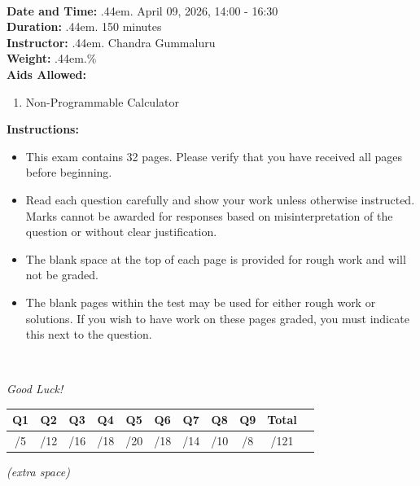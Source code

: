 \documentclass[12pt]{article}
\makeatletter
\newcommand\cdotfill{%
    \leavevmode\cleaders\hb@xt@.44em{\hss$.$\hss}\hfill\kern\z@
}
\makeatother
\begin{document}
\begin{minipage}{0.6\textwidth}
\begin{tabular}{|c|c|c|c|c|c|c|c|c|c|}
  \hspace{1.2em}\; & \hspace{1.2em}\; & \hspace{1.2em}\; & \hspace{1.2em}\; & \hspace{1.2em}\; & \hspace{1.2em}\; & \hspace{1.2em}\; & \hspace{1.2em}\; & \hspace{1.2em}\; & \hspace{1.2em}\;\\
  \hline
\end{tabular}
\end{minipage}
\\[0.75cm]
\noindent \textbf{Date and Time:}\cdotfill {April 09, 2026, 14:00 - 16:30}\\
\noindent \textbf{Duration:}\cdotfill {150 minutes}\\
\textbf{Instructor:}\cdotfill Chandra Gummaluru\\
\textbf{Weight:}\cdotfill 40\% \\
\textbf{Aids Allowed:}
\begin{enumerate}
    \item[(1)] Non-Programmable Calculator
\end{enumerate}
\textbf{Instructions:}
\begin{itemize}
    \item This exam contains 32 pages. Please verify that you have received all pages before beginning.
    \item Read each question carefully and show your work unless otherwise instructed. Marks cannot be awarded for responses based on misinterpretation of the question or without clear justification.
    \item The blank space at the top of each page is provided for rough work and will not be graded.
    \item The blank pages within the test may be used for either rough work or solutions. If you wish to have work on these pages graded, you must indicate this next to the question.
\end{itemize}
\\[0.25cm]
\begin{center}
    \textit{Good Luck!}
\end{center}

\vfill
\begin{center}
\begin{tabular}{|c|c|c|c|c|c|c|c|c|c|c|}
  \hline
  \textbf{Q1} & \textbf{Q2} & \textbf{Q3} & \textbf{Q4} & \textbf{Q5} &
  \textbf{Q6} & \textbf{Q7} & \textbf{Q8} & \textbf{Q9} & \textbf{Total} \\
  \hline
  /5 & /12 & /16 & /18 & /20 & /18 & /14 & /10 & /8 & /121 \\[1.2em]
  \hline
\end{tabular}
\end{center}

\clearpage



\clearpage

\begin{center}
    \textit{(extra space)}
\end{center}
\end{document}
